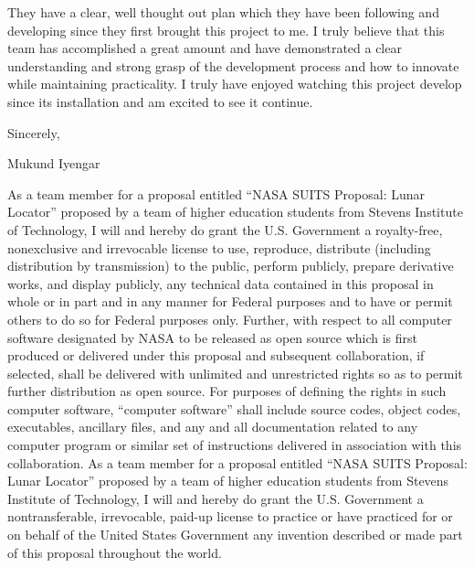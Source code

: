 \documentclass{article}
\let\Oldsubsection\subsection
\renewcommand{\subsection}{\FloatBarrier\Oldsubsection}
\newcommand{\maintitle}{NASA SUITS Proposal: Lunar Locator}
\newcommand{\schoolname}{Stevens Institute of Technology}
\begin{document}
They have a clear, well thought out plan which they have been following and developing since they first brought this project to me. I truly believe that this team has accomplished a great amount and have demonstrated a clear understanding and strong grasp of the development process and how to innovate while maintaining practicality. I truly have enjoyed watching this project develop since its installation and am excited to see it continue.

Sincerely,

Mukund Iyengar

\fi

\newpage

\newcommand{\rightsofuse}{

\subsection{Statement of Rights of Use}

}



\iffalse

{
As a team member for a proposal entitled “\maintitle” proposed by a team of higher education students from \schoolname, I will and hereby do grant the U.S. Government a royalty-free, nonexclusive and irrevocable license to use, reproduce, distribute (including distribution by transmission) to the public, perform publicly, prepare derivative works, and display publicly, any technical data contained in this proposal in whole or in part and in any manner for Federal purposes and to have or permit others to do so for Federal purposes only. Further, with respect to all computer software designated by NASA to be released as open source which is first produced or delivered under this proposal and subsequent collaboration, if selected, shall be delivered with unlimited and unrestricted rights so as to permit further distribution as open source. For purposes of defining the rights in such computer software, “computer software” shall include source codes, object codes, executables, ancillary files, and any and all documentation related to any computer program or similar set of instructions delivered in association with this collaboration. As a team member for a proposal entitled “\maintitle” proposed by a team of higher education students from \schoolname, I will and hereby do grant the U.S. Government a nontransferable, irrevocable, paid-up license to practice or have practiced for or on behalf of the United States Government any invention described or made part of this proposal throughout the world.
}
\end{document}
